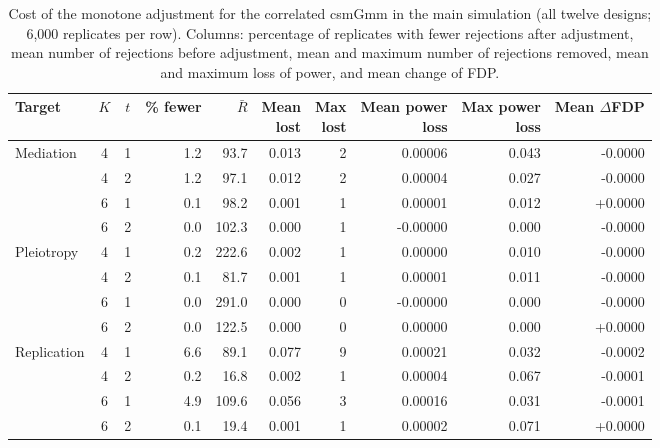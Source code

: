 \begin{table}[!htbp]
\centering
\caption{Cost of the monotone adjustment for the correlated csmGmm in the main simulation (all twelve designs; 6{,}000 replicates per row). Columns: percentage of replicates with fewer rejections after adjustment, mean number of rejections before adjustment, mean and maximum number of rejections removed, mean and maximum loss of power, and mean change of FDP.}\label{tab:adjustment-cost}
\footnotesize
\setlength{\tabcolsep}{4pt}
\begin{tabular}{lcc rrrr rr r}
\toprule
Target & $K$ & $t$ & \% fewer & $\bar R$ & \shortstack{Mean\\lost} & \shortstack{Max\\lost} & \shortstack{Mean power\\loss} & \shortstack{Max power\\loss} & \shortstack{Mean\\$\Delta$FDP}\\
\midrule
Mediation & 4 & 1 & 1.2 & 93.7 & 0.013 & 2 & 0.00006 & 0.043 & -0.0000\\
 & 4 & 2 & 1.2 & 97.1 & 0.012 & 2 & 0.00004 & 0.027 & -0.0000\\
 & 6 & 1 & 0.1 & 98.2 & 0.001 & 1 & 0.00001 & 0.012 & +0.0000\\
 & 6 & 2 & 0.0 & 102.3 & 0.000 & 1 & -0.00000 & 0.000 & -0.0000\\
Pleiotropy & 4 & 1 & 0.2 & 222.6 & 0.002 & 1 & 0.00000 & 0.010 & -0.0000\\
 & 4 & 2 & 0.1 & 81.7 & 0.001 & 1 & 0.00001 & 0.011 & -0.0000\\
 & 6 & 1 & 0.0 & 291.0 & 0.000 & 0 & -0.00000 & 0.000 & -0.0000\\
 & 6 & 2 & 0.0 & 122.5 & 0.000 & 0 & 0.00000 & 0.000 & +0.0000\\
Replication & 4 & 1 & 6.6 & 89.1 & 0.077 & 9 & 0.00021 & 0.032 & -0.0002\\
 & 4 & 2 & 0.2 & 16.8 & 0.002 & 1 & 0.00004 & 0.067 & -0.0001\\
 & 6 & 1 & 4.9 & 109.6 & 0.056 & 3 & 0.00016 & 0.031 & -0.0001\\
 & 6 & 2 & 0.1 & 19.4 & 0.001 & 1 & 0.00002 & 0.071 & +0.0000\\
\bottomrule
\end{tabular}
\end{table}
